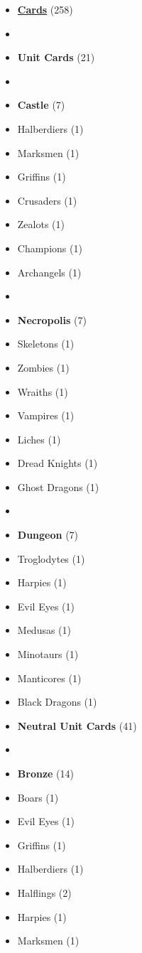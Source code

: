 \begin{multicols*}{3}
\begin{itemize}[leftmargin=0pt, label={}, noitemsep, noitemsep]
  \item \textbf{\small{\underline{Cards}}} (258)
  \item
  \item \textbf{Unit Cards} (21)
  \item
  \item \textbf{Castle} (7)
  \item Halberdiers (1)
  \item Marksmen (1)
  \item Griffins (1)
  \item Crusaders (1)
  \item Zealots (1)
  \item Champions (1)
  \item Archangels (1)
  \item
  \item \textbf{Necropolis} (7)
  \item Skeletons (1)
  \item Zombies (1)
  \item Wraiths (1)
  \item Vampires (1)
  \item Liches (1)
  \item Dread Knights (1)
  \item Ghost Dragons (1)
  \item
  \item \textbf{Dungeon} (7)
  \item Troglodytes (1)
  \item Harpies (1)
  \item Evil Eyes (1)
  \item Medusas (1)
  \item Minotaurs (1)
  \item Manticores (1)
  \item Black Dragons (1)
\columnbreak
  \item \textbf{Neutral Unit Cards} (41)
  \item
  \item \textbf{Bronze} (14)
  \item Boars (1)
  \item Evil Eyes (1)
  \item Griffins (1)
  \item Halberdiers (1)
  \item Halflings (2)
  \item Harpies (1)
  \item Marksmen (1)

\end{itemize}
\end{multicols*}
